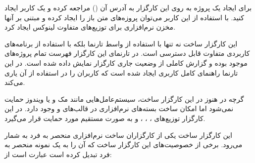 
برای ایجاد یک پروژه به روی این کارگزار به آدرس آن ()
مراجعه کرده و یک  کاربر ایجاد کنید. با استفاده از این کاربر می‌توان پروزه‌های متن باز را ایجاد کرده و
مبتنی بر آنها مخزن نرم‌افزاری برای توزیع‌های متفاوت لینوکس ایجاد کرد.

این کارگزار ساخت نه تنها با استفاده از واسط تارنما بلکه با استفاده از برنامه‌های
کاربردی متفاوت قابل دسترسی است. در تارنمای این کارگزار فهرست تمام پروژه‌های
موجود بوده و گزارش کاملی از وضعیت جاری کارگزار نمایش داده شده است. در این تارنما
راهنمای کامل کاربری ایجاد شده است که کاربران را در استفاده از آن یاری می‌کند.


%
%
%



گرچه در هنوز در این کارگزار ساخت، سیستم‌عامل‌هایی مانند مک و
یا ویندوز حمایت نمی‌شود اما امکان ساخت بسته‌های نرم‌افزاری در قالب‌های
 و  وجود دارد. در این
کارگزار توزیع‌های ، ، ،  و
 به صورت مستقیم مورد حمایت قرار می‌گیرد.


%

این کارگزار ساخت یکی از کارگزاران ساخت نرم‌افزاری منحصر به فرد به شمار می‌رود.
برخی از خصوصیت‌های این کارگزار ساخت که آن را به یک نمونه منحصر به فرد تبدیل کرده
است عبارت است از:

